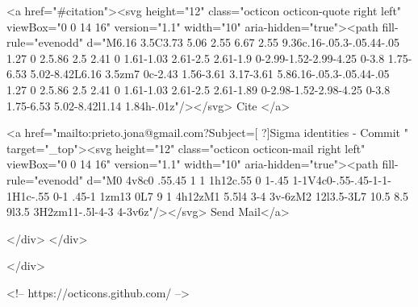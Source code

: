       <a  href="#citation"><svg height="12" class="octicon octicon-quote right left" viewBox="0 0 14 16" version="1.1" width="10" aria-hidden="true"><path fill-rule="evenodd" d="M6.16 3.5C3.73 5.06 2.55 6.67 2.55 9.36c.16-.05.3-.05.44-.05 1.27 0 2.5.86 2.5 2.41 0 1.61-1.03 2.61-2.5 2.61-1.9 0-2.99-1.52-2.99-4.25 0-3.8 1.75-6.53 5.02-8.42L6.16 3.5zm7 0c-2.43 1.56-3.61 3.17-3.61 5.86.16-.05.3-.05.44-.05 1.27 0 2.5.86 2.5 2.41 0 1.61-1.03 2.61-2.5 2.61-1.89 0-2.98-1.52-2.98-4.25 0-3.8 1.75-6.53 5.02-8.42l1.14 1.84h-.01z"/></svg> Cite
      </a>

      <a href="mailto:prieto.jona@gmail.com?Subject=[ ?]Sigma identities - Commit " target="_top"><svg height="12" class="octicon octicon-mail right left" viewBox="0 0 14 16" version="1.1" width="10" aria-hidden="true"><path fill-rule="evenodd" d="M0 4v8c0 .55.45 1 1 1h12c.55 0 1-.45 1-1V4c0-.55-.45-1-1-1H1c-.55 0-1 .45-1 1zm13 0L7 9 1 4h12zM1 5.5l4 3-4 3v-6zM2 12l3.5-3L7 10.5 8.5 9l3.5 3H2zm11-.5l-4-3 4-3v6z"/></svg> Send Mail</a>

    </div>
  </div>

</div>

<!-- https://octicons.github.com/ -->





